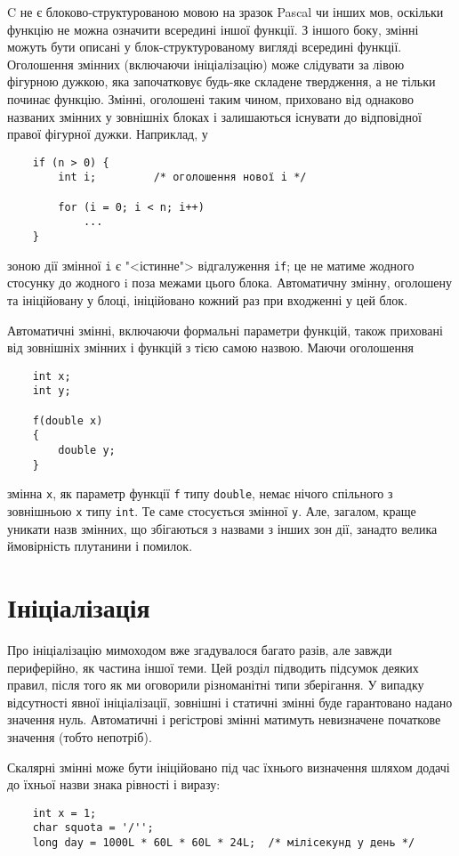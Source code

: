 \documentclass[a4paper,12pt]{book}
\begin{document}
  C не є блоково-структурованою мовою на зразок Pascal чи інших мов, оскільки
  функцію не можна означити всередині іншої функції. З іншого боку, змінні можуть бути
  описані у блок-структурованому вигляді всередині функції. Оголошення змінних (включаючи
  ініціалізацію) може слідувати за лівою фігурною дужкою, яка започатковує будь-яке
  складене твердження, а не тільки починає функцію. Змінні, оголошені таким чином,
  приховано від однаково названих змінних у зовнішніх блоках і залишаються існувати до
  відповідної правої фігурної дужки. Наприклад, у
  \begin{verbatim}
    if (n > 0) {
        int i;         /* оголошення нової i */

        for (i = 0; i < n; i++)
            ...
    }
  \end{verbatim}
  зоною дії змінної \texttt{i} є "<істинне"> відгалуження \texttt{if}; це не
  матиме жодного стосунку до жодного i поза межами цього блока. Автоматичну змінну,
  оголошену та ініційовану у блоці, ініційовано кожний раз при входженні у цей блок.

  Автоматичні змінні, включаючи формальні параметри функцій, також приховані від
  зовнішніх змінних і функцій з тією самою назвою. Маючи оголошення
  \begin{verbatim}
    int x;
    int y;

    f(double x)
    {
        double y;
    }
  \end{verbatim}
  змінна \texttt{x}, як параметр функції \texttt{f} типу \texttt{double}, немає нічого
  спільного з зовнішньою \texttt{x} типу \texttt{int}. Те саме стосується змінної
  \texttt{y}. Але, загалом, краще уникати назв змінних, що збігаються з назвами з інших
  зон дії, занадто велика ймовірність плутанини і помилок.

\section{Ініціалізація}


  Про ініціалізацію мимоходом вже згадувалося багато разів, але завжди периферійно, як
  частина іншої теми. Цей розділ підводить підсумок деяких правил, після того як ми
  оговорили різноманітні типи зберігання. У випадку відсутності явної ініціалізації,
  зовнішні і статичні змінні буде гарантовано надано значення нуль. Автоматичні і
  регістрові змінні матимуть невизначене початкове значення (тобто непотріб).

  Скалярні змінні може бути ініційовано під час їхнього визначення шляхом додачі
  до їхньої назви знака рівності і виразу:
  \begin{verbatim}
    int x = 1;
    char squota = '/'';
    long day = 1000L * 60L * 60L * 24L;  /* мілісекунд у день */
  \end{verbatim}
\end{document}
